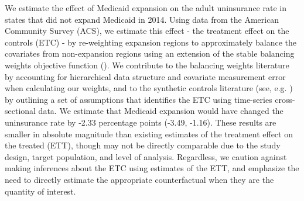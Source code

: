 We estimate the effect of Medicaid expansion on the adult uninsurance rate in states that did not expand Medicaid in 2014. Using data from the American Community Survey (ACS), we estimate this effect - the treatment effect on the controls (ETC) - by re-weighting expansion regions to approximately balance the covariates from non-expansion regions using an extension of the stable balancing weights objective function (\cite{zubizarreta2015stable}). We contribute to the balancing weights literature by accounting for hierarchical data structure and covariate measurement error when calculating our weights, and to the synthetic controls literature (see, e.g. \cite{abadie2010synthetic}) by outlining a set of assumptions that identifies the ETC using time-series cross-sectional data. We estimate that Medicaid expansion would have changed the uninsurance rate by -2.33 percentage points (-3.49, -1.16). These results are smaller in absolute magnitude than existing estimates of the treatment effect on the treated (ETT), though may not be directly comparable due to the study design, target population, and level of analysis. Regardless, we caution against making inferences about the ETC using estimates of the ETT, and emphasize the need to directly estimate the appropriate counterfactual when they are the quantity of interest.

